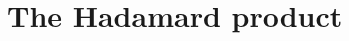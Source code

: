 \documentclass[11pt, lettersize, notitlepage, leqno, footskip=0.6cm]{article}
\newcommand{\wti}{\widetilde}
\newcommand{\mc}{\mathcal}
\newcommand{\mbf}{\mathbf}
\newcommand{\mr}{\mathrm}
\newcommand{\be}{\beta}
\newcommand{\what}{\widehat}
\newcommand{\mP}{\mc{P}}
\newcommand{\V}{\mc{V}}
\newcommand{\vs}{\vspace{-0.15cm}}
\newcommand{\sta}{\stackrel{?}{=}}
\newcommand{\e}{\mbf{e}}
\numberwithin{equation}{section}
\begin{document}
\begin{comment}



\item $\mP$ computes $$ f_{_{\prod,\gamma}} (X)  :=   f(\gamma \cdot X)\cdot \Big[\frac{X^{\deg(f)+1}-1}{X-1} -  f^{\mr{Rev}}(X) \Big] $$ and sends the commitment \vs $$a_{_{\prod,\gamma}} := g_1^{f_{_{\prod,\gamma}}(s)}  $$ along with a proof of $\hyperlink{Prod}{\tt{ZKPoProd}}[g_1,\;(a,\;(a^{\vee})^{-1}\cdot \what{g}_1 ),\; a_{_{\prod,\gamma}}]$


\item $\mP$ sends a proof of $\hyperlink{Coef}{\tt{ZKPoCoef}}[g_1,\;(a_{_{\prod,\gamma}}, a_{\deg}, 1)]$

\item $\V$ verifies the $\hyperlink{Deg}{\tt{ZKPoDeg}}$, the $\hyperlink{DegMono}{\tt{ZKPoDegMono}}$, the $\hyperlink{Rev}{\tt{ZKPoRev}}$, the $\hyperlink{Const}{\tt{ZKPoConst}}$, the $\hyperlink{Coef}{\tt{ZKPoCoef}}$, the $\hyperlink{Prod}{\tt{ZKPoProd}}$ and the $\hyperlink{Twist}{\tt{ZKPoTwist}}$.


\end{enumerate}

\end{mdframed}










\bigskip



\end{comment}

\section{\fontsize{11}{11}\selectfont The Hadamard product}
\end{document}

